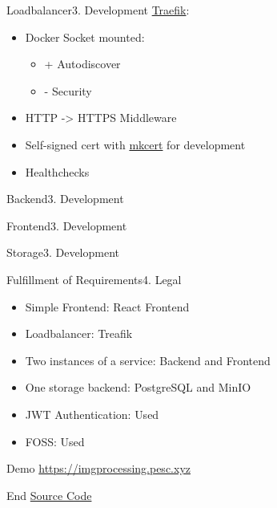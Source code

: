 \documentclass[aspectratio=169,20pt]{beamer}
\begin{document}
\begin{frame}{Loadbalancer}{3. Development}
	\underline{Traefik}:
	\begin{itemize}
		\item{Docker Socket mounted:}
		\begin{itemize}
			\item{+ Autodiscover}
			\item{- Security}
		\end{itemize}
		\item{HTTP -> HTTPS Middleware}
		\item{Self-signed cert with \href{https://github.com/FiloSottile/mkcert}{mkcert} for development}
		\item{Healthchecks}
	\end{itemize}
\end{frame}

\begin{frame}{Backend}{3. Development}

\end{frame}

\begin{frame}{Frontend}{3. Development}

\end{frame}

\begin{frame}{Storage}{3. Development}

\end{frame}

\begin{frame}{Fulfillment of Requirements}{4. Legal}
	\begin{itemize}
		\item{Simple Frontend: \textcolor{deepgreen}{React Frontend}}
		\item{Loadbalancer: \textcolor{deepgreen}{Treafik}}
		\item{Two instances of a service: \textcolor{deepgreen}{Backend and Frontend}}
		\item{One storage backend: \textcolor{deepgreen}{PostgreSQL and MinIO}}
		\item{JWT Authentication: \textcolor{deepgreen}{Used}}
		\item{FOSS: \textcolor{deepgreen}{Used}}
	\end{itemize}
\end{frame}


\begin{frame}{Demo}{}
	\href{https://imgprocessing.pesc.xyz/}{https://imgprocessing.pesc.xyz}
\end{frame}

\begin{frame}{End}{}
	\href{https://github.com/imgProcessing/backend}{Source Code}
\end{frame}
\end{document}

